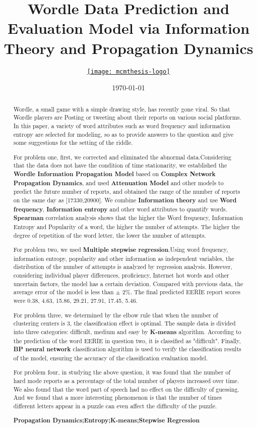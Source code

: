 \documentclass{mcmthesis}
\title{Wordle Data Prediction and Evaluation Model via Information Theory and Propagation Dynamics} %
\author{\small \href{http://www.latexstudio.net/}
  {\texttt{[image: mcmthesis-logo]}}}
\date{\today}
\begin{document}
\setcounter{tocdepth}{2}
\begin{abstract}
	
 Wordle, a small game with a simple drawing style, has recently gone viral. So that Wordle players are Posting or tweeting about their reports on various social platforms. In this paper, a variety of word attributes such as word frequency and information entropy are selected for modeling, so as to provide answers to the question and give some suggestions for the setting of the riddle.
 
For problem one, first, we corrected and eliminated the abnormal data.Considering that the data does not have the condition of time stationarity, we established the \textbf{Wordle Information Propagation Model} based on \textbf{Complex Network Propagation Dynamics}, and used \textbf{Attenuation Model} and other models to predict the future number of reports, and obtained the range of the number of reports on the same day as [17330,20900]. We combine \textbf{Information theory} and use \textbf{Word frequency}, \textbf{Information entropy} and other word attributes to quantify words. \textbf{Spearman} correlation analysis shows that the higher the Word frequency, Information Entropy and Popularity of a word, the higher the number of attempts. The higher the degree of repetition of the word letter, the lower the number of attempts.
	  
	For problem two, we used \textbf{Multiple stepwise regression}.Using word frequency, information entropy, popularity and other information as independent variables, the distribution of the number of attempts is analyzed by regression analysis. However, considering individual player differences, proficiency, Internet hot words and other uncertain factors, the model has a certain deviation. Compared with previous data, the average error of the model is less than  $\pm$ 2\%. The final predicted EERIE report scores were 0.38, 4.63, 15.86, 29.21, 27.91, 17.45, 5.46.   
	 
	 For problem three, we determined by the elbow rule that when the number of clustering centers is 3, the classification effect is optimal. The sample data is divided into three categories: difficult, medium and easy by \textbf{K-means} algorithm. According to the prediction of the word EERIE in question two, it is classified as "difficult". Finally, \textbf{BP neural network} classification algorithm is used to verify the classification results of the model, ensuring the accuracy of the classification evaluation model. 
	  
	  For problem four, in studying the above question, it was found that the number of hard mode reports as a percentage of the total number of players increased over time. We also found that the word part of speech had no effect on the difficulty of guessing. And we found that a more interesting phenomenon is that the number of times different letters appear in a puzzle can even affect the difficulty of the puzzle.
	  
\begin{keywords}
\textbf{Propagation Dynamics;\quad Entropy;\quad K-means;\quad Stepwise Regression}
\end{keywords}
\end{abstract}
\end{document}
